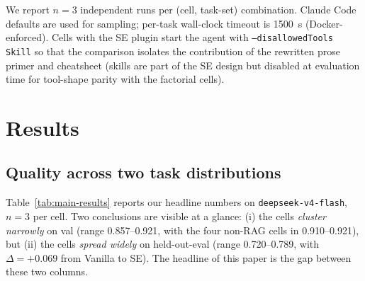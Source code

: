 \documentclass{article}
\begin{document}
We report $n=3$ independent runs per (cell, task-set) combination. Claude Code defaults are used for sampling; per-task wall-clock timeout is 1500~s (Docker-enforced). Cells with the SE plugin start the agent with \texttt{--disallowedTools Skill} so that the comparison isolates the contribution of the rewritten prose primer and cheatsheet (skills are part of the SE design but disabled at evaluation time for tool-shape parity with the factorial cells).


\section{Results}
\label{sec:results}

\subsection{Quality across two task distributions}
\label{subsec:quality}

Table~\ref{tab:main-results} reports our headline numbers on \texttt{deepseek-v4-flash}, $n=3$ per cell. Two conclusions are visible at a glance: (i) the cells \emph{cluster narrowly} on val (range 0.857--0.921, with the four non-RAG cells in 0.910--0.921), but (ii) the cells \emph{spread widely} on held-out-eval (range 0.720--0.789, with $\Delta = +0.069$ from Vanilla to SE). The headline of this paper is the gap between these two columns.
\end{document}
